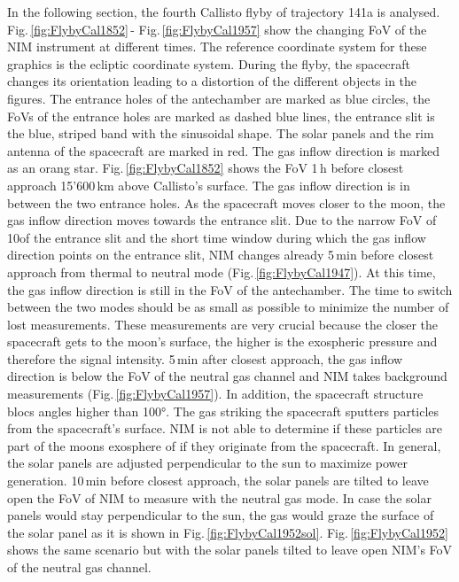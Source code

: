 		In the following section, the fourth Callisto flyby of trajectory 141a \cite{SOC_Crema3p2} is analysed. Fig.\,\ref{fig:FlybyCal1852}\,- Fig.\,\ref{fig:FlybyCal1957} show the changing FoV of the NIM instrument at different times. The reference coordinate system for these graphics is the ecliptic coordinate system. During the flyby, the spacecraft changes its orientation leading to a distortion of the different objects in the figures. The entrance holes of the antechamber are marked as blue circles, the FoVs of the entrance holes are marked as dashed blue lines, the entrance slit is the blue, striped band with the sinusoidal shape. The solar panels and the rim antenna of the spacecraft are marked in red. The gas inflow direction is marked as an orang star. Fig.\,\ref{fig:FlybyCal1852} shows the FoV 1\,h before closest approach 15'600\,km above Callisto's surface. The gas inflow direction is in between the two entrance holes. As the spacecraft moves closer to the moon, the gas inflow direction moves towards the entrance slit. Due to the narrow FoV of 10\degree of the entrance slit and the short time window during which the gas inflow direction points on the entrance slit, NIM changes already 5\,min before closest approach from thermal to neutral mode (Fig.\,\ref{fig:FlybyCal1947}). At this time, the gas inflow direction is still in the FoV of the antechamber. The time to switch between the two modes should be as small as possible to minimize the number of lost measurements. These measurements are very crucial because the closer the spacecraft gets to the moon's surface, the higher is the exospheric pressure and therefore the signal intensity. 5\,min after closest approach, the gas inflow direction is below the FoV of the neutral gas channel and NIM takes background measurements (Fig.\,\ref{fig:FlybyCal1957}). In addition, the spacecraft structure blocs angles higher than 100\si{\degree}. The gas striking the spacecraft sputters particles from the spacecraft's surface. NIM is not able to determine if these particles are part of the moons exosphere of if they originate from the spacecraft. In general, the solar panels are adjusted perpendicular to the sun to maximize power generation. 10\,min before closest approach, the solar panels are tilted to leave open the FoV of NIM to measure with the neutral gas mode. In case the solar panels would stay perpendicular to the sun, the gas would graze the surface of the solar panel as it is shown in Fig.\,\ref{fig:FlybyCal1952sol}. Fig.\,\ref{fig:FlybyCal1952} shows the same scenario but with the solar panels tilted to leave open NIM's FoV of the neutral gas channel.\\
